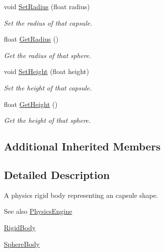 \begin{DoxyCompactItemize}
void \hyperlink{classTarbora_1_1CapsuleBody_ace07a924c2dd8830983b056a07813530}{Set\+Radius} (float radius)
\begin{DoxyCompactList}\small\item\em Set the radius of that capsule. \end{DoxyCompactList}\item 
\mbox{\label{classTarbora_1_1CapsuleBody_aa4838f288f011f812a3efed5abef24c5}} 
float \hyperlink{classTarbora_1_1CapsuleBody_aa4838f288f011f812a3efed5abef24c5}{Get\+Radius} ()
\begin{DoxyCompactList}\small\item\em Get the radius of that sphere. \end{DoxyCompactList}\item 
void \hyperlink{classTarbora_1_1CapsuleBody_a8d9cf25e8ce8cf0d180b67b2063f94f2}{Set\+Height} (float height)
\begin{DoxyCompactList}\small\item\em Set the height of that capsule. \end{DoxyCompactList}\item 
\mbox{\label{classTarbora_1_1CapsuleBody_ae1da23b6109046079febce5c0e44efcc}} 
float \hyperlink{classTarbora_1_1CapsuleBody_ae1da23b6109046079febce5c0e44efcc}{Get\+Height} ()
\begin{DoxyCompactList}\small\item\em Get the height of that sphere. \end{DoxyCompactList}\end{DoxyCompactItemize}
\subsection*{Additional Inherited Members}


\subsection{Detailed Description}
A physics rigid body representing an capsule shape. 

\begin{DoxySeeAlso}{See also}
\hyperlink{classTarbora_1_1PhysicsEngine}{Physics\+Engine} 

\hyperlink{classTarbora_1_1RigidBody}{Rigid\+Body} 

\hyperlink{classTarbora_1_1SphereBody}{Sphere\+Body} 
\end{DoxySeeAlso}


